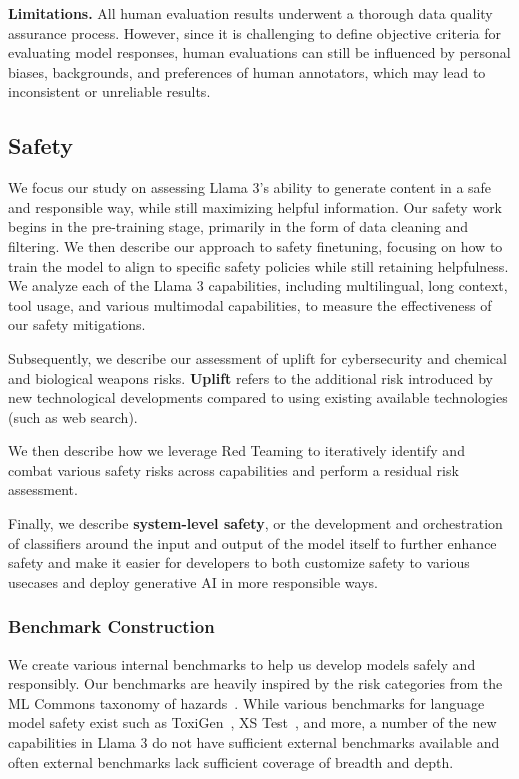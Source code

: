 \documentclass[dvipsnames]{fairmeta}
\begin{document}
\textbf{Limitations.} All human evaluation results underwent a thorough data quality assurance process.
However, since it is challenging to define objective criteria for evaluating model responses, human evaluations can still be influenced by personal biases, backgrounds, and preferences of human annotators, which may lead to inconsistent or unreliable results.

\subsection{Safety}
\label{section:results_safety}

We focus our study on assessing Llama 3's ability to generate content in a safe and responsible way, while still maximizing helpful information. Our safety work begins in the pre-training stage, primarily in the form of data cleaning and filtering. We then describe our approach to safety finetuning, focusing on how to train the model to align to specific safety policies while still retaining helpfulness. We analyze each of the Llama 3 capabilities, including multilingual, long context, tool usage, and various multimodal capabilities, to measure the effectiveness of our safety mitigations.

Subsequently, we describe our assessment of uplift for cybersecurity and chemical and biological weapons risks.
\textbf{Uplift} refers to the additional risk introduced by new technological developments compared to using existing available technologies (such as web search).

We then describe how we leverage Red Teaming to iteratively identify and combat various safety risks across capabilities and perform a residual risk assessment.

Finally, we describe \textbf{system-level safety}, or the development and orchestration of classifiers around the input and output of the model itself to further enhance safety and make it easier for developers to both customize safety to various usecases and deploy generative AI in more responsible ways.

\subsubsection{Benchmark Construction}

We create various internal benchmarks to help us develop models safely and responsibly. Our benchmarks are heavily inspired by the risk categories from the ML Commons taxonomy of hazards~\citep{vidgen2024introducing}.
While various benchmarks for language model safety exist such as ToxiGen~\citep{hartvigsen2022toxigen}, XS Test~\citep{rottger2023xstest}, and more, a number of the new capabilities in Llama 3 do not have sufficient external benchmarks available and often external benchmarks lack sufficient coverage of breadth and depth.
\end{document}

